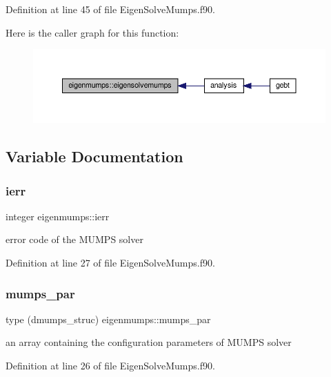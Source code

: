 Definition at line 45 of file Eigen\+Solve\+Mumps.\+f90.

Here is the caller graph for this function\+:\nopagebreak
\begin{figure}[H]
\begin{center}
\leavevmode
\includegraphics[width=350pt]{namespaceeigenmumps_ae4a95ffe93412104411a9914edccd507_icgraph}
\end{center}
\end{figure}


\subsection{Variable Documentation}
\mbox{\label{namespaceeigenmumps_a0b6d919fe610b180483db0dcba47ba1c}} 
\subsubsection{\texorpdfstring{ierr}{ierr}}
{\footnotesize\ttfamily integer eigenmumps\+::ierr}



error code of the M\+U\+M\+PS solver 



Definition at line 27 of file Eigen\+Solve\+Mumps.\+f90.

\mbox{\label{namespaceeigenmumps_a96a8141178a4cd84a24bd63b11685409}} 
\subsubsection{\texorpdfstring{mumps\+\_\+par}{mumps\_par}}
{\footnotesize\ttfamily type (dmumps\+\_\+struc) eigenmumps\+::mumps\+\_\+par}



an array containing the configuration parameters of M\+U\+M\+PS solver 



Definition at line 26 of file Eigen\+Solve\+Mumps.\+f90.

